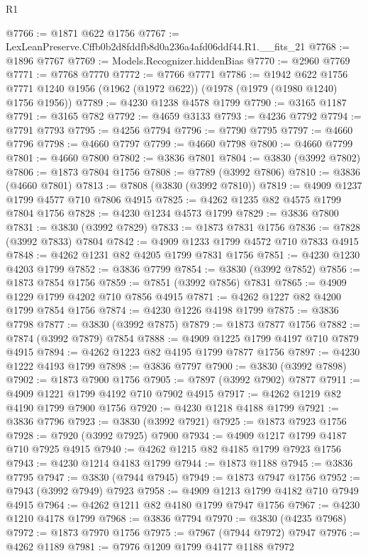 \begin{lexlean}{R1}
\begin{coremodule}
@7766 := @1871 @622 @1756
@7767 := LexLeanPreserve.Cffb0b2d8fddfb8d0a236a4afd06ddf44.R1.__fits_21
@7768 := @1896 @7767
@7769 := Models.Recognizer.hiddenBias
@7770 := @2960 @7769
@7771 := @7768 @7770
@7772 := @7766 @7771
@7786 := @1942
    @622
    @1756
    @7771
    @1240
    @1956
    (@1962 (@1972 @622))
    (@1978 (@1979 (@1980 @1240) @1756 @1956))
@7789 := @4230 @1238 @4578 @1799
@7790 := @3165 @1187
@7791 := @3165 @782
@7792 := @4659 @3133
@7793 := @4236 @7792
@7794 := @7791 @7793
@7795 := @4256 @7794
@7796 := @7790 @7795
@7797 := @4660 @7796
@7798 := @4660 @7797
@7799 := @4660 @7798
@7800 := @4660 @7799
@7801 := @4660 @7800
@7802 := @3836 @7801
@7804 := @3830 (@3992 @7802)
@7806 := @1873 @7804 @1756
@7808 := @7789 (@3992 @7806)
@7810 := @3836 (@4660 @7801)
@7813 := @7808 (@3830 (@3992 @7810))
@7819 := @4909 @1237 @1799 @4577 @710 @7806 @4915
@7825 := @4262 @1235 @82 @4575 @1799 @7804 @1756
@7828 := @4230 @1234 @4573 @1799
@7829 := @3836 @7800
@7831 := @3830 (@3992 @7829)
@7833 := @1873 @7831 @1756
@7836 := @7828 (@3992 @7833) @7804
@7842 := @4909 @1233 @1799 @4572 @710 @7833 @4915
@7848 := @4262 @1231 @82 @4205 @1799 @7831 @1756
@7851 := @4230 @1230 @4203 @1799
@7852 := @3836 @7799
@7854 := @3830 (@3992 @7852)
@7856 := @1873 @7854 @1756
@7859 := @7851 (@3992 @7856) @7831
@7865 := @4909 @1229 @1799 @4202 @710 @7856 @4915
@7871 := @4262 @1227 @82 @4200 @1799 @7854 @1756
@7874 := @4230 @1226 @4198 @1799
@7875 := @3836 @7798
@7877 := @3830 (@3992 @7875)
@7879 := @1873 @7877 @1756
@7882 := @7874 (@3992 @7879) @7854
@7888 := @4909 @1225 @1799 @4197 @710 @7879 @4915
@7894 := @4262 @1223 @82 @4195 @1799 @7877 @1756
@7897 := @4230 @1222 @4193 @1799
@7898 := @3836 @7797
@7900 := @3830 (@3992 @7898)
@7902 := @1873 @7900 @1756
@7905 := @7897 (@3992 @7902) @7877
@7911 := @4909 @1221 @1799 @4192 @710 @7902 @4915
@7917 := @4262 @1219 @82 @4190 @1799 @7900 @1756
@7920 := @4230 @1218 @4188 @1799
@7921 := @3836 @7796
@7923 := @3830 (@3992 @7921)
@7925 := @1873 @7923 @1756
@7928 := @7920 (@3992 @7925) @7900
@7934 := @4909 @1217 @1799 @4187 @710 @7925 @4915
@7940 := @4262 @1215 @82 @4185 @1799 @7923 @1756
@7943 := @4230 @1214 @4183 @1799
@7944 := @1873 @1188
@7945 := @3836 @7795
@7947 := @3830 (@7944 @7945)
@7949 := @1873 @7947 @1756
@7952 := @7943 (@3992 @7949) @7923
@7958 := @4909 @1213 @1799 @4182 @710 @7949 @4915
@7964 := @4262 @1211 @82 @4180 @1799 @7947 @1756
@7967 := @4230 @1210 @4178 @1799
@7968 := @3836 @7794
@7970 := @3830 (@4235 @7968)
@7972 := @1873 @7970 @1756
@7975 := @7967 (@7944 @7972) @7947
@7976 := @4262 @1189
@7981 := @7976 @1209 @1799 @4177 @1188 @7972

\end{coremodule}
\end{lexlean}
